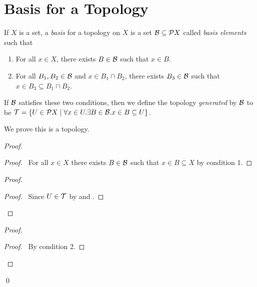 \section{Basis for a Topology}

\begin{definition}[Basis]
    If $X$ is a set, a \emph{basis} for a topology on $X$ is a set $\mathcal{B} \subseteq \mathcal{P} X$ called \emph{basis elements} such that
    \begin{enumerate}
        \item For all $x \in X$, there exists $B \in \mathcal{B}$ such that $x \in B$.
        \item For all $B_1, B_2 \in \mathcal{B}$ and $x \in B_1 \cap B_2$, there exists $B_3 \in \mathcal{B}$ such that
        $x \in B_3 \subseteq B_1 \cap B_2$.
    \end{enumerate}

    If $\mathcal{B}$ satisfies these two conditions, then we define the topology \emph{generated} by $\mathcal{B}$ to be
    $\mathcal{T} = \{ U \in \mathcal{P} X \mid \forall x \in U. \exists B \in \mathcal{B}. x \in B \subseteq U \}$.
\end{definition}

We prove this is a topology.

\begin{proof}
    \pf
    \begin{proof}
        \pf\ For all $x \in X$ there exists $B \in \mathcal{B}$ such that $x \in B \subseteq X$ by condition 1.
    \end{proof}
    \begin{proof}
        \begin{proof}
            \pf\ Since $U \in \mathcal{T}$ by  and .
        \end{proof}
    \end{proof}
    \begin{proof}
        \begin{proof}
            \pf\ By condition 2.
        \end{proof}
    \end{proof}
    \qed
\end{proof}

